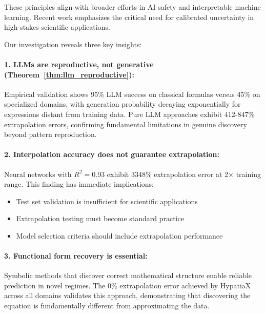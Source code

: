 These principles align with broader efforts in AI safety and interpretable machine learning. Recent work emphasizes the critical need for calibrated uncertainty in high-stakes scientific applications.


Our investigation reveals three key insights:

\paragraph{1. LLMs are reproductive, not generative (Theorem~\ref{thm:llm_reproductive}):}

Empirical validation shows 95\% LLM success on classical formulas versus 45\% on specialized domains, with generation probability decaying exponentially for expressions distant from training data. Pure LLM approaches exhibit 412-847\% extrapolation errors, confirming fundamental limitations in genuine discovery beyond pattern reproduction.

\paragraph{2. Interpolation accuracy does not guarantee extrapolation:}

Neural networks with $R^2 = 0.93$ exhibit 3348\% extrapolation error at 2$\times$ training range. This finding has immediate implications:
\begin{itemize}
\item Test set validation is insufficient for scientific applications
\item Extrapolation testing must become standard practice
\item Model selection criteria should include extrapolation performance
\end{itemize}

\paragraph{3. Functional form recovery is essential:}

Symbolic methods that discover correct mathematical structure enable reliable prediction in novel regimes. The 0\% extrapolation error achieved by HypatiaX across all domains validates this approach, demonstrating that discovering the equation is fundamentally different from approximating the data.


